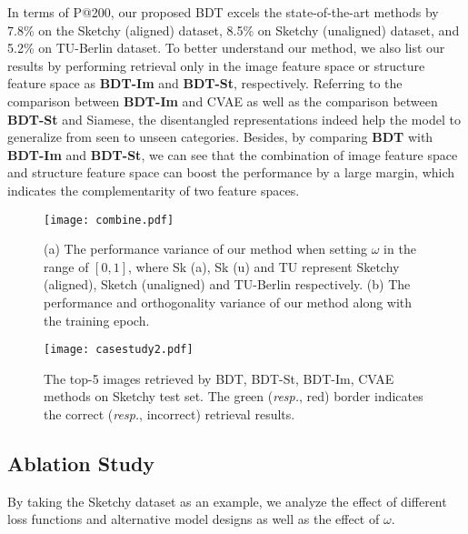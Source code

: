 \documentclass[10pt,twocolumn,letterpaper]{article}
\begin{document}
In terms of P@200, our proposed BDT excels the state-of-the-art methods by 7.8\% on the Sketchy (aligned) dataset, 8.5\% on Sketchy (unaligned) dataset, and 5.2\% on TU-Berlin dataset. 
To better understand our method, we also list our results by performing retrieval only in the image feature space or structure feature space as \textbf{BDT-Im} and \textbf{BDT-St}, respectively. Referring to the comparison between \textbf{BDT-Im} and CVAE as well as the comparison between \textbf{BDT-St} and Siamese, the disentangled representations indeed help the model to generalize from seen to unseen categories. 
Besides, by comparing \textbf{BDT} with \textbf{BDT-Im} and \textbf{BDT-St}, we can see that the combination of image feature space and structure feature space can boost the performance by a large margin, which indicates the complementarity of two feature spaces.

\begin{figure}
\begin{center}
\texttt{[image: combine.pdf]}
\end{center}
\vspace{-15pt}
   \caption{(a) The performance variance of our method when setting $\omega$ in the range of $[0, 1]$, where Sk (a), Sk (u) and TU represent Sketchy (aligned), Sketch (unaligned) and TU-Berlin respectively. (b) The performance and orthogonality variance of our method along with the training epoch.}
\label{fig:orth}
\vspace{-12pt}
\end{figure}

\begin{figure*}
\begin{center}
\texttt{[image: casestudy2.pdf]}
\end{center}
\vspace{-10pt}
   \caption{The top-5 images retrieved by BDT, BDT-St, BDT-Im, CVAE methods on Sketchy test set. The green (\emph{resp.}, red) border indicates the correct (\emph{resp.}, incorrect) retrieval results.}
\label{fig:case}
\vspace{-12pt}
\end{figure*}

\subsection{Ablation Study}
By taking the Sketchy dataset as an example, we analyze the effect of different loss functions and alternative model designs as well as the effect of $\omega$.
\end{document}
